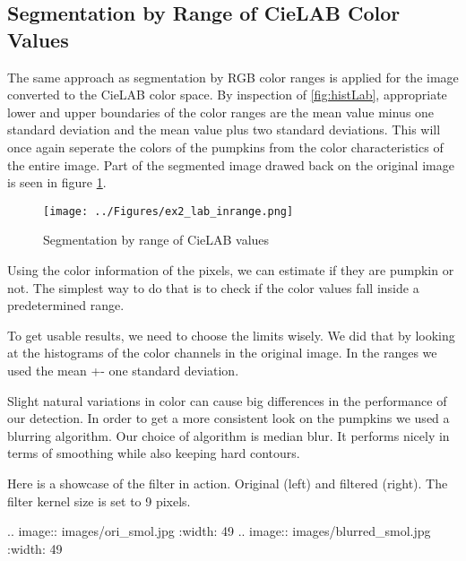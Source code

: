\documentclass[../Head/Main.tex]{subfiles}
\begin{document}
\subsection{Segmentation by Range of CieLAB Color Values}
The same approach as segmentation by RGB color ranges is applied for the image converted to the CieLAB color space. By inspection of \ref{fig:histLab}, appropriate lower and upper boundaries of the color ranges are the mean value minus one standard deviation and the mean value plus two standard deviations. This will once again seperate the colors of the pumpkins from the color characteristics of the entire image. Part of the segmented image drawed back on the original image is seen in figure \ref{fig:labSeg}.

\begin{figure}[H]
\centering
\texttt{[image: ../Figures/ex2\_lab\_inrange.png]}
\caption{Segmentation by range of CieLAB values}
\label{fig:labSeg}
\end{figure}

Using the color information of the pixels, we can estimate if they are pumpkin or not.
The simplest way to do that is to check if the color values fall inside a predetermined range.

To get usable results, we need to choose the limits wisely.
We did that by looking at the histograms of the color channels in the original image.
In the ranges we used the mean +- one standard deviation.

Slight natural variations in color can cause big differences in the performance of our detection.
In order to get a more consistent look on the pumpkins we used a blurring algorithm.
Our choice of algorithm is median blur. It performs nicely in terms of smoothing while also keeping hard contours.

Here is a showcase of the filter in action. Original (left) and filtered (right). The filter kernel size is set to 9 pixels.

.. image:: images/ori_smol.jpg
    :width: 49 %
.. image:: images/blurred_smol.jpg
    :width: 49 %
\end{document}
